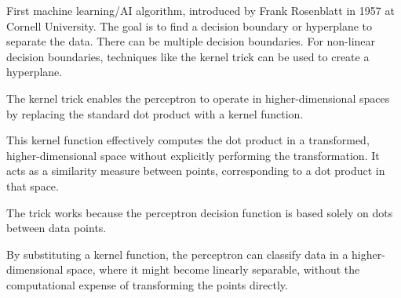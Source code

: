 \begin{outline}
    \1 First machine learning/AI algorithm, introduced by Frank Rosenblatt in 1957 at Cornell University\cite{rosenblatt1958perceptron}.
    \1 The goal is to find a decision boundary or hyperplane to separate the data. There can be multiple decision boundaries.
    \1 For non-linear decision boundaries, techniques like the kernel trick can be used to create a hyperplane.

    The kernel trick enables the perceptron to operate in higher-dimensional spaces by replacing the standard dot product with a kernel function. 
    
    This kernel function effectively computes the dot product in a transformed, higher-dimensional space without explicitly performing the transformation. It acts as a similarity measure between points, corresponding to a dot product in that space. 
    
    The trick works because the perceptron decision function is based solely on dots between data points. 
    
    By substituting a kernel function, the perceptron can classify data in a higher-dimensional space, where it might become linearly separable, without the computational expense of transforming the points directly.

    \begin{figure}[h]
    \centering
    \begin{subfigure}[b]{0.45\textwidth}
        \centering
\end{subfigure}
\end{figure}
\end{outline}
